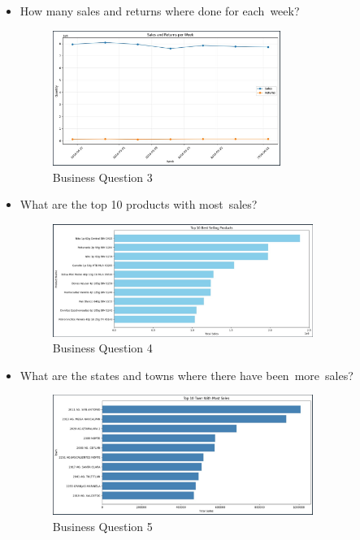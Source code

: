 \documentclass{article}
\begin{document}
\begin{itemize}
    \item How many sales and returns where done for each week?

    \begin{figure}[H] 
        \begin{center}
        \centering
        \includegraphics[width=0.7\textwidth]{images/question3.jpg}
        \caption{Business Question 3}
        \end{center}
    \end{figure}


    \item What are the top 10 products with most sales?

    \begin{figure}[H] 
        \begin{center}
        \centering
        \includegraphics[width=0.8\textwidth]{images/question4.jpg}
        \caption{Business Question 4}
        \end{center}
    \end{figure}

    \item What are the states and towns where there have been more sales?

    \begin{figure}[H] 
        \begin{center}
        \centering
        \includegraphics[width=0.8\textwidth]{images/question5.jpg}
        \caption{Business Question 5}
        \end{center}
    \end{figure}

\end{itemize}
\end{document}
